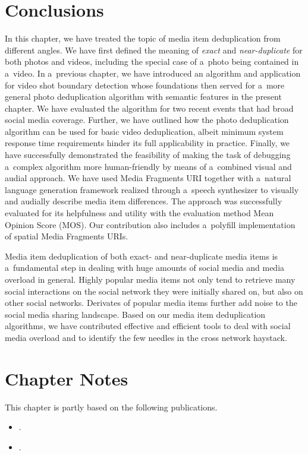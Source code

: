 \section{Conclusions}

In this chapter, we have treated the topic of media item deduplication
from different angles.
We have first defined the meaning of \emph{exact} and \emph{near-duplicate}
for both photos and videos,
including the special case of a~photo being contained in a~video.
In a~previous chapter,
we have introduced an algorithm and application
for video shot boundary detection
whose foundations then served for a~more general
photo deduplication algorithm with semantic features
in the present chapter.
We have evaluated the algorithm for two recent events
that had broad social media coverage.
Further, we have outlined how the photo deduplication algorithm
can be used for basic video deduplication,
albeit minimum system response time requirements
hinder its full applicability in practice.
Finally, we have successfully demonstrated the feasibility
of making the task of debugging a~complex algorithm
more human-friendly by means of a~combined visual and audial approach.
We have used Media Fragments URI
together with a~natural language generation framework
realized through a~speech synthesizer to visually and audially
describe media item differences.
The approach was successfully evaluated for its helpfulness and utility
with the evaluation method Mean Opinion Score (MOS).
Our contribution also includes a~polyfill implementation
of spatial Media Fragments URIs.

Media item deduplication of both exact- and near-duplicate media items
is a~fundamental step in dealing with huge amounts of social media
and media overload in general.
Highly popular media items not only tend
to retrieve many social interactions on the social network
they were initially shared on, but also on other social networks.
Derivates of popular media items further add noise
to the social media sharing landscape.
Based on our media item deduplication algorithms,
we have contributed effective and efficient tools
to deal with social media overload
and to identify the few needles in the cross network haystack.

\section*{Chapter Notes}
This chapter is partly based on the following publications.

\begin{itemize}
  \item {}.
  \item {}.
\end{itemize}


\clearpage

